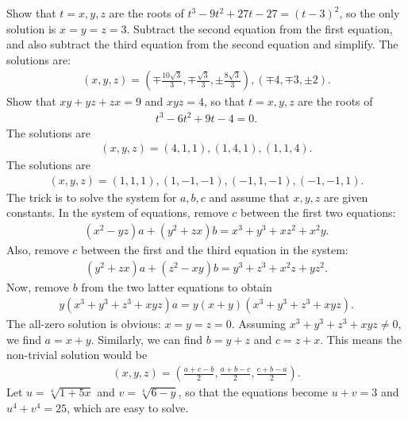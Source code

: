 \begin{solution}
    \begin{tasks}
        \task Show that $t=x,y,z$ are the roots of $t^3-9t^2+27t-27=(t-3)^2$, so the only solution is $x=y=z=3$.
        \task Subtract the second equation from the first equation, and also subtract the third equation from the second equation and simplify. The solutions are:
        \begin{align*}
            (x,y,z)= \left(\mp\frac{10\sqrt 3}{3}, \mp \frac{\sqrt 3}{3}, \pm\frac{8\sqrt{3}}{3}\right), (\mp 4, \mp 3, \pm 2).
        \end{align*}
        \task Show that $xy+yz+zx=9$ and $xyz=4$, so that $t=x,y,z$ are the roots of
        \begin{align*}
            t^3-6t^2+9t-4=0.
        \end{align*}
        The solutions are
        \begin{align*}
            (x,y,z)=(4,1,1), (1,4,1), (1,1,4).
        \end{align*}
        \task The solutions are
        \begin{align*}
            (x,y,z)= (1,1,1), (1,-1,-1), (-1,1,-1), (-1,-1,1).
        \end{align*}
        \task The trick is to solve the system for $a,b,c$ and assume that $x,y,z$ are given constants. In the system of equations, remove $c$ between the first two equations:
        \begin{align*}
            (x^2-yz)a+(y^2+zx)b = x^3 + y^3 + xz^2 + x^2y.
        \end{align*}
        Also, remove $c$ between the first and the third equation in the system:
        \begin{align*}
            (y^2+zx)a+(z^2-xy)b = y^3+z^3+x^2z+yz^2.
        \end{align*}
        Now, remove $b$ from the two latter equations to obtain
        \begin{align*}
            y(x^3+y^3+z^3+xyz)a = y(x+y)(x^3+y^3+z^3+xyz).
        \end{align*}
        The all-zero solution is obvious: $x=y=z=0$. Assuming $x^3+y^3+z^3+xyz\neq 0$, we find $a=x+y$. Similarly, we can find $b=y+z$ and $c=z+x$. This means the non-trivial solution would be
        \begin{align*}
            (x,y,z) = \left(\frac{a+c-b}{2}, \frac{a+b-c}{2}, \frac{c+b-a}{2}\right).
        \end{align*}
        \task Let $u=\sqrt[4]{1+5x}$ and $v=\sqrt[4]{6-y}$, so that the equations become $u+v=3$ and $u^4+v^4=25$, which are easy to solve.
    \end{tasks}
\end{solution}





